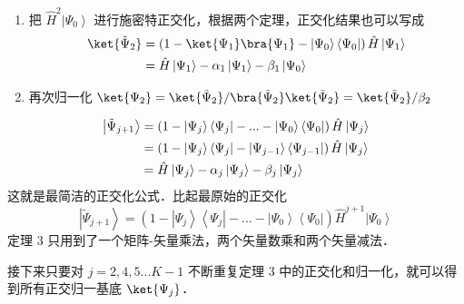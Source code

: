\begin{enumerate}[resume]
\item 把 ${\hat H^2}\left| {{\Psi_0}} \right\rangle$ 进行施密特正交化，根据两个定理，正交化结果也可以写成
\begin{equation}
\begin{aligned}
\ket{{\tilde \Psi }_2}  &= \left( {1 -\ket{\Psi_1}  \bra {\Psi_1}  - \left| {\Psi_0} \right\rangle \left\langle {\Psi_0} \right|} \right)\hat H\left| {\Psi_1} \right\rangle \\
   &= \hat H\left| {\Psi_1} \right\rangle  - {\alpha_1}\left| {\Psi_1} \right\rangle  - {\beta_1}\left| {\Psi_0} \right\rangle \\ 
\end{aligned}
\end{equation}
\item 再次归一化  $\ket{\Psi_2} = \ket{\tilde\Psi_2}/\bra{\tilde\Psi_2}\ket{\tilde\Psi_2} = \ket{\tilde\Psi_2}/\beta_2$
\end{enumerate}

{\noindent {}}
\begin{equation}\begin{aligned}
  \left| {{\tilde \Psi }_{j + 1}} \right\rangle  &= \left( {1 - \left| {\Psi_j} \right\rangle \left\langle {\Psi_j} \right| - ... - \left| {\Psi_0} \right\rangle \left\langle {\Psi_0} \right|} \right)\hat H\left| {\Psi_j} \right\rangle\\
&= \left( {1 - \left| {\Psi_j} \right\rangle \left\langle {\Psi_j} \right| - \left| {\Psi_{j - 1}} \right\rangle \left\langle {\Psi_{j - 1}} \right|} \right)\hat H\left| {\Psi_j} \right\rangle  \hfill \\
&= \hat H\left| {\Psi_j} \right\rangle  - {\alpha_j}\left| {\Psi_j} \right\rangle  - {\beta_j}\left| {\Psi_j} \right\rangle 
\end{aligned}\end{equation}
这就是最简洁的正交化公式．比起最原始的正交化
\begin{equation}
\left| {{\tilde \Psi }_{j + 1}} \right\rangle  = \left( {1 - \left| {\Psi_j} \right\rangle \left\langle {\Psi_j} \right| - ... - \left| {\Psi_0} \right\rangle \left\langle {\Psi_0} \right|} \right){\hat H^{j + 1}}\left| {\Psi_0} \right\rangle 
\end{equation}
定理 3 只用到了一个矩阵-矢量乘法，两个矢量数乘和两个矢量减法．

接下来只要对 $j = 2,4,5...K - 1$ 不断重复定理 3 中的正交化和归一化，就可以得到所有正交归一基底 $\ket{\Psi_j} $．

